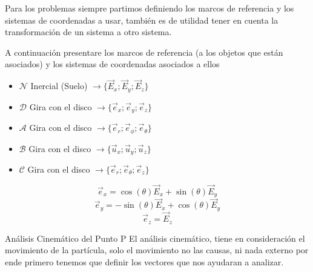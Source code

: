 \begin{sol}
Para los problemas siempre partimos definiendo los marcos de referencia y los sistemas de coordenadas a usar, también es de utilidad tener en cuenta la transformación de un sistema a otro sistema.
\begin{marcos}
A continuación presentare los marcos de referencia (a los objetos que están asociados) y los sistemas de coordenadas asociados a ellos
    \begin{itemize}
    \item $\mathcal{N}$ Inercial (Suelo) $\longrightarrow\{\vec{E}_x;\vec{E}_y;\vec{E}_z\}$
    \item $\mathcal{D}$ Gira con el disco $\longrightarrow\{\vec{e}_x;\vec{e}_y;\vec{e}_z\}$
    \item $\mathcal{A}$ Gira con el disco $\longrightarrow\{\vec{e}_r;\vec{e}_\phi;\vec{e}_\theta\}$
    \item $\mathcal{B}$ Gira con el disco $\longrightarrow\{\vec{u}_x;\vec{u}_y;\vec{u}_z\}$
    \item $\mathcal{C}$ Gira con el disco $\longrightarrow\{\vec{e}_r;\vec{e}_\theta;\vec{e}_z\}$
\end{itemize}
\begin{center}
    \begin{minipage}{0.48\textwidth}
        \centering
    \end{minipage}
    \hfill %
    \begin{minipage}{0.48\textwidth}
        \centering
    \end{minipage}
\end{center}
$$\vec{e}_x=\cos{(\theta)}\vec{E}_x+\sin{(\theta)}\vec{E}_y$$
$$\vec{e}_y=-\sin{(\theta)}\vec{E}_x+\cos{(\theta)}\vec{E}_y$$
$$\vec{e}_z=\vec{E}_z$$
\end{marcos}

\begin{cinematicaUnificada}{Análisis Cinemático del Punto P}
        El análisis cinemático, tiene en consideración el movimiento de la partícula, solo el movimiento no las causas, ni nada externo por ende primero tenemos que definir los vectores que nos ayudaran a analizar.


\end{cinematicaUnificada}
\end{sol}
